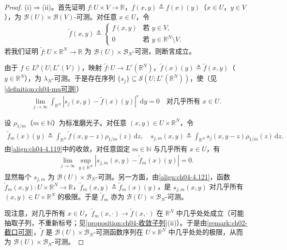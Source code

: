\documentclass[../../main.tex]{subfiles}%
\begin{document}
\begin{proof}
(i)$\Rightarrow$(ii)。首先证明 $f:U\times V\to\mathbb{R}$，$f(x,y)\triangleq f(x)(y)$（$x\in U$，$y\in V$），为 $\mathcal{B}(U)\times\mathcal{B}(V)$-可测。对任意 $x\in U$，令
\begin{align*}
\tilde f(x,y)\triangleq \begin{cases}
f(x,y) & \text{若 }y\in V,\\
0 & \text{若 }y\in\mathbb{R}^N\setminus V.
\end{cases}
\end{align*}
若我们证明 $\tilde f:U\times\mathbb{R}^N\to\mathbb{R}$ 为 $\mathcal{B}(U)\times\mathcal{B}_N$-可测，则断言成立。

由于 $f\in L^p(U;L^r(V))$，映射 $\tilde f:U\to L^r(\mathbb{R}^N)$，$\tilde f(x)(y)\triangleq \tilde f(x,y)$（$y\in\mathbb{R}^N$），为 $\lambda_N$-可测。于是存在序列 $\{s_j\}\subseteq\mathcal{S}(U;L^r(\mathbb{R}^N))$，使（见\cref{definition:ch04-mu可测}）
\begin{align}
\lim_{j\to\infty}\int_{\mathbb{R}^N}|s_j(x,y)-\tilde f(x)(y)|^r\,\mathrm{d}y=0\quad\text{对几乎所有 }x\in U. \label{align:ch04-4.119}
\end{align}

设 $\rho_{1/m}$（$m\in\mathbb{N}$）为标准磨光子。对任意 $(x,y)\in U\times\mathbb{R}^N$，令
\begin{align}
\tilde f_m(x)(y)\triangleq \int_{\mathbb{R}^N}\tilde f(x,y-z)\rho_{1/m}(z)\,\mathrm{d}z,\quad
s_{j,m}(x,y)\triangleq \int_{\mathbb{R}^N}s_j(x,y-z)\rho_{1/m}(z)\,\mathrm{d}z. \label{align:ch04-4.120}
\end{align}
由\eqref{align:ch04-4.119}中的收敛，对任意固定 $m\in\mathbb{N}$ 与几乎所有 $x\in U$，有
\begin{align}
\lim_{j\to\infty}\sup_{y\in\mathbb{R}^N}|s_{j,m}(x,y)-\tilde f_m(x)(y)|=0. \label{align:ch04-4.121}
\end{align}
显然每个 $s_{j,m}$ 为 $\mathcal{B}(U)\times\mathcal{B}_N$-可测。另一方面，由\eqref{align:ch04-4.121}，函数 $\tilde f_m(x,y):U\times\mathbb{R}^N\to\mathbb{R}$，$\tilde f_m(x,y)\triangleq \tilde f_m(x)(y)$，是 $s_{j,m}(x,y)$ 对几乎所有 $(x,y)\in U\times\mathbb{R}^N$ 的极限。于是 $\tilde f_m$ 亦为 $\mathcal{B}(U)\times\mathcal{B}_N$-可测。

现注意，对几乎所有 $x\in U$，$\tilde f_m(x,\cdot)\to\tilde f(x,\cdot)$ 在 $\mathbb{R}^N$ 中几乎处处成立（可能抽取子列，不重新标号；见\cref{proposition:ch04-收敛子列}(ii)）。于是由\cref{remark:ch02-截口可测}，$\tilde f$ 是 $\mathcal{B}(U)\times\mathcal{B}_N$-可测函数序列在 $U\times\mathbb{R}^N$ 中几乎处处的极限，从而为 $\mathcal{B}(U)\times\mathcal{B}_N$-可测。


\end{proof}
\end{document}
